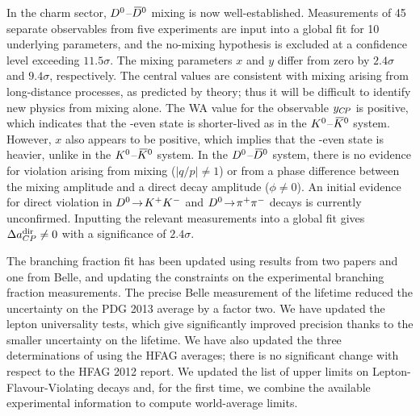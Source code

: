 In the charm sector, $D^0$--$\kern 0.2em\overline{\kern -0.2em D}{}^0$ mixing is now well-established.
Measurements of 45 separate observables from five experiments are input 
into a global fit for 10 underlying parameters, and the no-mixing 
hypothesis is excluded at a confidence level exceeding $11.5\sigma$. 
The mixing parameters $x$ and $y$ differ from zero by 
$2.4\sigma$ and $9.4\sigma$, respectively. The central values are 
consistent with mixing arising from long-distance processes, as
predicted by theory; thus it will be difficult to identify 
new physics from mixing alone. The WA value for the observable $y_{C\!P}$ 
is positive, which indicates that the \CP-even state is shorter-lived 
as in the $K^0$--$\kern 0.2em\overline{\kern -0.2em K}{}^0$ system. However, $x$ also appears to be 
positive, which implies that the \CP-even state is heavier, 
unlike in the $K^0$--$\kern 0.2em\overline{\kern -0.2em K}{}^0$ system. 
%
In the $D^0$--$\kern 0.2em\overline{\kern -0.2em D}{}^0$ system, 
there is no evidence for \CP violation arising from mixing ($|q/p|\neq 1$) or 
from a phase difference between the mixing amplitude and 
a direct decay amplitude ($\phi\neq 0$). An initial evidence for direct
\CP violation in $D^0\!\rightarrow\! K^+K^-$ and $D^0\!\rightarrow\! \pi^+\pi^-$ decays is currently unconfirmed. 
Inputting the relevant measurements into a global 
fit gives $\Delta a^{\rm dir}_{CP}\neq 0$ with a significance 
of $2.4\sigma$.

The \mtau branching fraction fit has been updated using results from two
\babar papers and one from Belle, and updating the constraints on
the experimental branching fraction measurements.
The precise Belle measurement of the \mtau lifetime reduced the uncertainty on the PDG 2013 average by a factor two. 
We have updated the lepton universality tests, which give significantly improved precision thanks to the smaller uncertainty on the \mtau lifetime.
We have also updated the three determinations of \Vus using the \mtau HFAG averages; there is no significant change with respect to the HFAG 2012 report.
We updated the list of upper limits on \mtau Lepton-Flavour-Violating
decays and, for the first time, we combine the available experimental
information to compute world-average limits.
